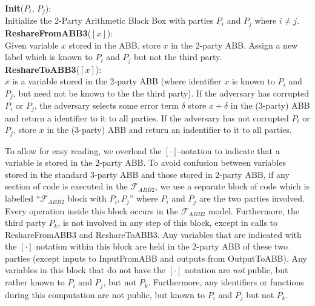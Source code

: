 \begin{functionality}
	\textbf{Init}($P_i$, $P_j$): \\
		\indent Initialize the 2-Party Arithmetic Black Box with parties $P_i$
		and $P_j$ where $i \neq j$.\\

	\noindent \textbf{ReshareFromABB3}($[x]$): \\
		\indent Given variable $x$ stored in the ABB, store $x$ in the 2-party ABB.
		Assign a new label which is known to $P_i$ and $P_j$ but not the
		third party.\\


	\noindent \textbf{ReshareToABB3}($[x]$):\\
		\indent $x$ is a variable stored in the 2-party ABB
		(where identifier $x$ is known to $P_i$ and $P_j$, 
		but need not be known to the the third party).
		If the adversary has corrupted $P_i$ or $P_j$,
		the adversary selects some error term $\delta$
		store $x + \delta$ in the (3-party) ABB
		and return a identifier to it to all parties.
		If the adversary has not corrupted $P_i$ or $P_j$,
		store $x$ in the (3-party) ABB and return an indentifier to it
		to all parties.
\end{functionality}

To allow for easy reading, we overload the $[\cdot]$-notation to indicate
that a variable is stored in the 2-party ABB.
To avoid confusion between variables stored in the standard 3-party ABB 
and those stored in 2-party ABB,
if any section of code is executed in the $\mathcal{F}_{ABB2}$,
we use a separate block of code which is labelled 
``$\mathcal{F}_{ABB2}$ block with $P_i, P_j$'' where $P_i$ and $P_j$ 
are the two parties involved.
Every operation inside this block occurs in the $\mathcal{F}_{ABB2}$ model.
Furthermore, the third party $P_k$, is not involved in any step
of this block, except in calls to ReshareFromABB3 and ReshareToABB3.
Any variables that are indicated with the $[\cdot]$ notation within
this block are held in the 2-party ABB of these two parties
(except inputs to InputFromABB and outputs from OutputToABB).
Any variables in this block that do not have the $[\cdot]$ notation
are \emph{not} public, but rather known to $P_i$ and $P_j$, but not $P_k$.
Furthermore, any identifiers or functions during this computation
are not public, but known to $P_i$ and $P_j$ but not $P_k$.

